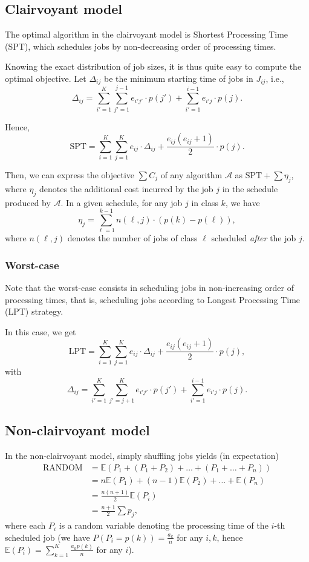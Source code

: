 \documentclass{article}
\begin{document}

\subsection{Clairvoyant model}

The optimal algorithm in the clairvoyant model is Shortest Processing Time (SPT), which schedules jobs by non-decreasing order of processing times.

Knowing the exact distribution of job sizes, it is thus quite easy to compute the optimal objective.
Let \(\Delta_{ij}\) be the minimum starting time of jobs in \(J_{ij}\), i.e.,
\[
    \Delta_{ij}=\sum_{i'=1}^{K} \sum_{j'=1}^{j-1} e_{i'j'} \cdot p(j') + \sum_{i'=1}^{i-1} e_{i'j} \cdot p(j).
\]

Hence,
\[
    \text{SPT}=\sum_{i=1}^{K} \sum_{j=1}^{K} e_{ij} \cdot \Delta_{ij} + \frac{e_{ij}(e_{ij}+1)}{2} \cdot p(j).
\]

Then, we can express the objective \(\sum C_j\) of any algorithm \(\mathcal{A}\) as \(\text{SPT}+\sum \eta_j\),
where \(\eta_j\) denotes the additional cost incurred by the job \(j\) in the schedule produced by \(\mathcal{A}\).
In a given schedule, for any job \(j\) in class \(k\), we have
\[
    \eta_j=\sum_{\ell=1}^{k-1} n(\ell,j)\cdot (p(k)-p(\ell)),
\]
where \(n(\ell,j)\) denotes the number of jobs of class \(\ell\) scheduled \emph{after} the job \(j\).

\subsubsection{Worst-case}

Note that the worst-case consists in scheduling jobs in non-increasing order of processing times, that is, scheduling jobs according to Longest Processing Time (LPT) strategy.

In this case, we get
\[
    \text{LPT}=\sum_{i=1}^{K} \sum_{j=1}^{K} e_{ij} \cdot \Delta_{ij} + \frac{e_{ij}(e_{ij}+1)}{2} \cdot p(j),
\]
with
\[
    \Delta_{ij}=\sum_{i'=1}^{K} \sum_{j'=j+1}^{K} e_{i'j'} \cdot p(j') + \sum_{i'=1}^{i-1} e_{i'j} \cdot p(j).
\]

\subsection{Non-clairvoyant model}

In the non-clairvoyant model, simply shuffling jobs yields (in expectation)
\begin{align*}
    \text{RANDOM}&=\mathbb{E}(P_1+(P_1+P_2)+\dots+(P_1+\dots+P_n)) \\
    &=n\mathbb{E}(P_1)+(n-1)\mathbb{E}(P_2)+\dots+\mathbb{E}(P_n) \\
    &=\frac{n(n+1)}{2}\mathbb{E}(P_i) \\
    &=\frac{n+1}{2}\sum p_j,
\end{align*}
where each \(P_i\) is a random variable denoting the processing time of the \(i\)-th scheduled job (we have
\(P(P_i=p(k))=\frac{a_k}{n}\) for any \(i,k\), hence \(\mathbb{E}(P_i)=\sum_{k=1}^{K} \frac{a_k p(k)}{n}\) for any \(i\)).
\end{document}
